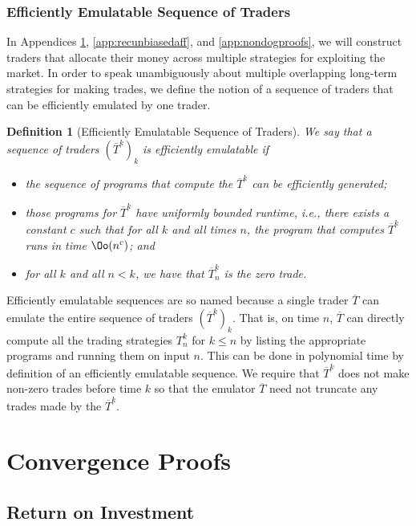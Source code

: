 \documentclass[authordate,onecolumn,noenvironments]{miri-tech-article}
\newtheorem{definition}[theorem]{Definition}
\numberwithin{equation}{subsection}
\newcommand{\seq}[1]{{\overline{#1}}}
\newcommand{\trade}{T}%
\newcommand{\Trader}{\seq{\trade}} %
\begin{document}
\subsubsection{Efficiently Emulatable Sequence of Traders}\label{app:emulatable}

In Appendices \ref{app:convergenceproofs}, \ref{app:recunbiasedaff}, and \ref{app:nondogproofs},
we will construct traders that allocate their money across multiple strategies for exploiting the market. 
In order to speak unambiguously about multiple overlapping long-term strategies for making trades, 
we define the notion of a sequence of traders that can be efficiently emulated by one trader.
%
\begin{definition}[Efficiently Emulatable Sequence of Traders]\label{def:emulatabletraders}
  We say that a sequence of traders  $( \Trader^k)_k$ is \emph{efficiently emulatable} if
\begin{itemize}
\item the sequence of programs that compute the $\Trader^k$ can be efficiently generated; 
\item those programs for $\Trader^k$ have uniformly bounded runtime, i.e., 
  there exists a constant $c$ such that for all $k$ and all times $n$, the program that computes $\Trader^k$ runs in time $\Oo(n^c)$; and
\item for all $k$ and all $n<k$, we have that $\Trader^k_n$ is the zero trade.
\end{itemize}
\end{definition}
%
\noindent Efficiently emulatable sequences are so named because a single trader $\Trader$ can emulate the entire sequence of traders 
$(\Trader^k)_k$. That is, on time $n$, $\Trader$ can directly compute all the trading strategies $\trade^k_n$ for $k\le n$ by listing the appropriate programs
and running them on input $n$. This can be done in polynomial time by definition of an efficiently emulatable sequence. 
We require that $\Trader^k$ does not make non-zero trades before time $k$ so that the emulator $\Trader$ need not truncate any trades made by the $\Trader^k$.




\section{Convergence Proofs}\label{app:convergenceproofs}

\subsection{Return on Investment}\label{app:roi}
\end{document}
